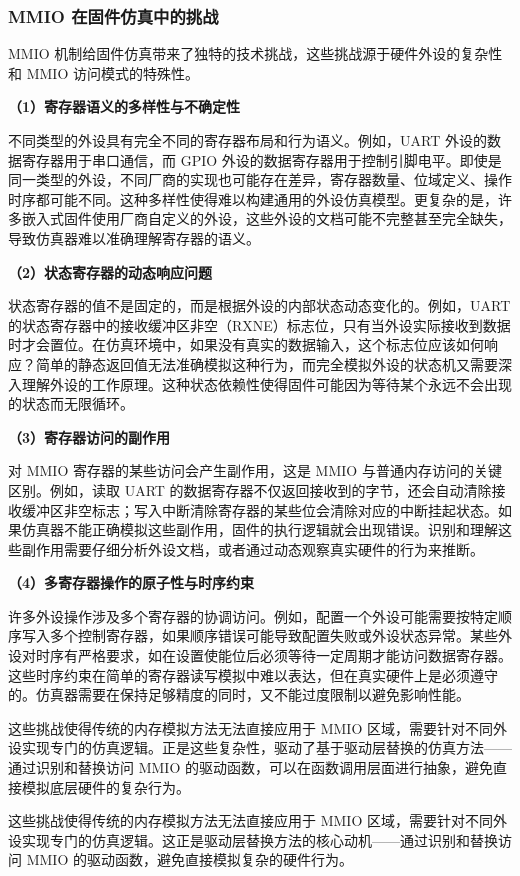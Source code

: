 \subsubsection{MMIO 在固件仿真中的挑战}

MMIO 机制给固件仿真带来了独特的技术挑战，这些挑战源于硬件外设的复杂性和 MMIO 访问模式的特殊性。

\textbf{（1）寄存器语义的多样性与不确定性}

不同类型的外设具有完全不同的寄存器布局和行为语义。例如，UART 外设的数据寄存器用于串口通信，而 GPIO 外设的数据寄存器用于控制引脚电平。即使是同一类型的外设，不同厂商的实现也可能存在差异，寄存器数量、位域定义、操作时序都可能不同。这种多样性使得难以构建通用的外设仿真模型。更复杂的是，许多嵌入式固件使用厂商自定义的外设，这些外设的文档可能不完整甚至完全缺失，导致仿真器难以准确理解寄存器的语义。

\textbf{（2）状态寄存器的动态响应问题}

状态寄存器的值不是固定的，而是根据外设的内部状态动态变化的。例如，UART 的状态寄存器中的接收缓冲区非空（RXNE）标志位，只有当外设实际接收到数据时才会置位。在仿真环境中，如果没有真实的数据输入，这个标志位应该如何响应？简单的静态返回值无法准确模拟这种行为，而完全模拟外设的状态机又需要深入理解外设的工作原理。这种状态依赖性使得固件可能因为等待某个永远不会出现的状态而无限循环。

\textbf{（3）寄存器访问的副作用}

对 MMIO 寄存器的某些访问会产生副作用，这是 MMIO 与普通内存访问的关键区别。例如，读取 UART 的数据寄存器不仅返回接收到的字节，还会自动清除接收缓冲区非空标志；写入中断清除寄存器的某些位会清除对应的中断挂起状态。如果仿真器不能正确模拟这些副作用，固件的执行逻辑就会出现错误。识别和理解这些副作用需要仔细分析外设文档，或者通过动态观察真实硬件的行为来推断。

\textbf{（4）多寄存器操作的原子性与时序约束}

许多外设操作涉及多个寄存器的协调访问。例如，配置一个外设可能需要按特定顺序写入多个控制寄存器，如果顺序错误可能导致配置失败或外设状态异常。某些外设对时序有严格要求，如在设置使能位后必须等待一定周期才能访问数据寄存器。这些时序约束在简单的寄存器读写模拟中难以表达，但在真实硬件上是必须遵守的。仿真器需要在保持足够精度的同时，又不能过度限制以避免影响性能。

这些挑战使得传统的内存模拟方法无法直接应用于 MMIO 区域，需要针对不同外设实现专门的仿真逻辑。正是这些复杂性，驱动了基于驱动层替换的仿真方法——通过识别和替换访问 MMIO 的驱动函数，可以在函数调用层面进行抽象，避免直接模拟底层硬件的复杂行为。

这些挑战使得传统的内存模拟方法无法直接应用于 MMIO 区域，需要针对不同外设实现专门的仿真逻辑。这正是驱动层替换方法的核心动机——通过识别和替换访问 MMIO 的驱动函数，避免直接模拟复杂的硬件行为。
